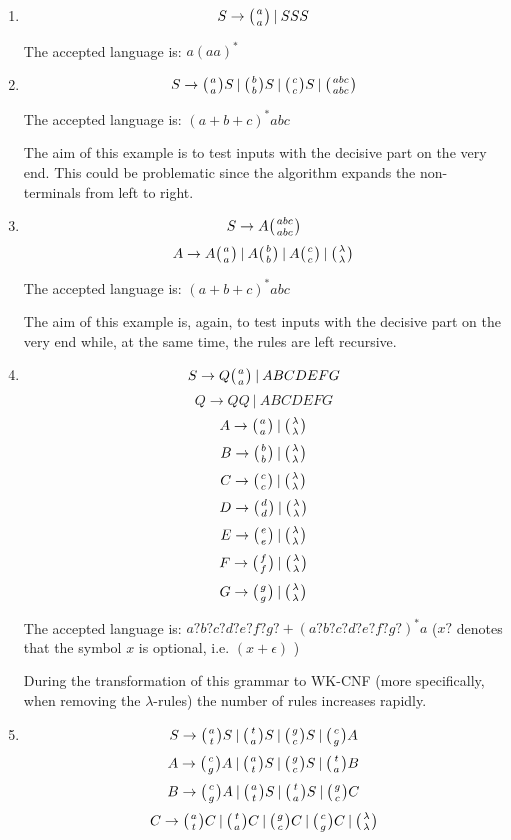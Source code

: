 \begin{enumerate}
  \item{
    $$S \rightarrow \wkpair{a}{a} \:|\: S S S$$

    The accepted language is: $a(aa)^*$
  }

  \item{
    $$S \rightarrow \wkpair{a}{a} S \:|\: \wkpair{b}{b} S \:|\: \wkpair{c}{c} S \:|\: \wkpair{abc}{abc}$$

    The accepted language is: $(a+b+c)^*abc$

    The aim of this example is to test inputs with the decisive part on the very end. This could be problematic since the algorithm expands the non-terminals from left to right.
  }

  \item{
    $$S \rightarrow A \wkpair{abc}{abc}$$
    $$A \rightarrow A \wkpair{a}{a} \:|\: A \wkpair{b}{b} \:|\: A \wkpair{c}{c} \:|\: \wkpair{\lambda}{\lambda}$$

    The accepted language is: $(a+b+c)^*abc$

    The aim of this example is, again, to test inputs with the decisive part on the very end while, at the same time, the rules are left recursive.
  }

  \item{
    $$S \rightarrow Q \wkpair{a}{a} \:|\: A B C D E F G$$
    $$Q \rightarrow Q Q \:|\: A B C D E F G$$
    $$A \rightarrow \wkpair{a}{a} \:|\: \wkpair{\lambda}{\lambda}$$
    $$B \rightarrow \wkpair{b}{b} \:|\: \wkpair{\lambda}{\lambda}$$
    $$C \rightarrow \wkpair{c}{c} \:|\: \wkpair{\lambda}{\lambda}$$
    $$D \rightarrow \wkpair{d}{d} \:|\: \wkpair{\lambda}{\lambda}$$
    $$E \rightarrow \wkpair{e}{e} \:|\: \wkpair{\lambda}{\lambda}$$
    $$F \rightarrow \wkpair{f}{f} \:|\: \wkpair{\lambda}{\lambda}$$
    $$G \rightarrow \wkpair{g}{g} \:|\: \wkpair{\lambda}{\lambda}$$

    The accepted language is: $a?b?c?d?e?f?g? + (a?b?c?d?e?f?g?)^*a$ ($x?$ denotes that the symbol $x$ is optional, i.e. $(x + \epsilon)$ )

    During the transformation of this grammar to WK-CNF (more specifically, when removing the $\lambda$-rules) the number of rules increases rapidly.
  }


  \item{
    $$S \rightarrow \wkpair{a}{t} S \:|\: \wkpair{t}{a} S \:|\: \wkpair{g}{c} S \:|\: \wkpair{c}{g} A$$
    $$A \rightarrow \wkpair{c}{g} A \:|\: \wkpair{a}{t} S \:|\: \wkpair{g}{c} S \:|\: \wkpair{t}{a} B$$
    $$B \rightarrow \wkpair{c}{g} A \:|\: \wkpair{a}{t} S \:|\: \wkpair{t}{a} S \:|\: \wkpair{g}{c} C$$
    $$C \rightarrow \wkpair{a}{t} C \:|\: \wkpair{t}{a} C \:|\: \wkpair{g}{c} C \:|\: \wkpair{c}{g} C \:|\: \wkpair{\lambda}{\lambda}$$

}
\end{enumerate}
